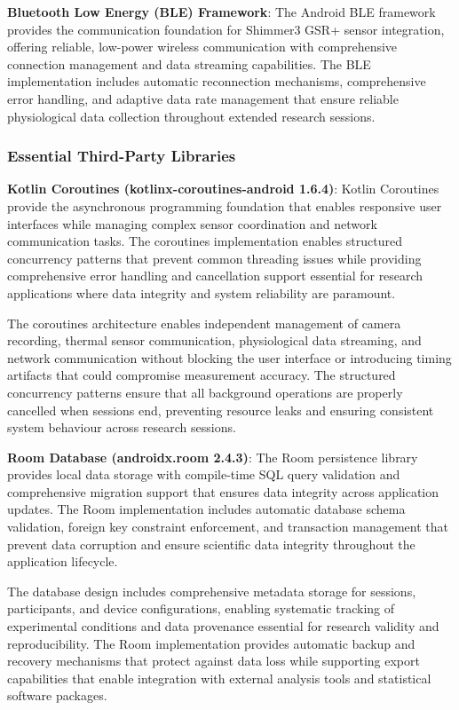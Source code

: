 \documentclass[11pt,a4paper]{report}
\begin{document}
\noindent \textbf{Bluetooth Low Energy (BLE) Framework}: The Android BLE framework provides the communication foundation for Shimmer3 GSR+ sensor integration, offering reliable, low-power wireless communication with comprehensive connection management and data streaming capabilities. The BLE implementation includes automatic reconnection mechanisms, comprehensive error handling, and adaptive data rate management that ensure reliable physiological data collection throughout extended research sessions.

\subsubsection{Essential Third-Party Libraries}

\noindent \textbf{Kotlin Coroutines (kotlinx-coroutines-android 1.6.4)}: Kotlin Coroutines provide the asynchronous programming foundation that enables responsive user interfaces while managing complex sensor coordination and network communication tasks. The coroutines implementation enables structured concurrency patterns that prevent common threading issues while providing comprehensive error handling and cancellation support essential for research applications where data integrity and system reliability are paramount.

The coroutines architecture enables independent management of camera recording, thermal sensor communication, physiological data streaming, and network communication without blocking the user interface or introducing timing artifacts that could compromise measurement accuracy. The structured concurrency patterns ensure that all background operations are properly cancelled when sessions end, preventing resource leaks and ensuring consistent system behaviour across research sessions.

\noindent \textbf{Room Database (androidx.room 2.4.3)}: The Room persistence library provides local data storage with compile-time SQL query validation and comprehensive migration support that ensures data integrity across application updates. The Room implementation includes automatic database schema validation, foreign key constraint enforcement, and transaction management that prevent data corruption and ensure scientific data integrity throughout the application lifecycle.

The database design includes comprehensive metadata storage for sessions, participants, and device configurations, enabling systematic tracking of experimental conditions and data provenance essential for research validity and reproducibility. The Room implementation provides automatic backup and recovery mechanisms that protect against data loss while supporting export capabilities that enable integration with external analysis tools and statistical software packages.
\end{document}
